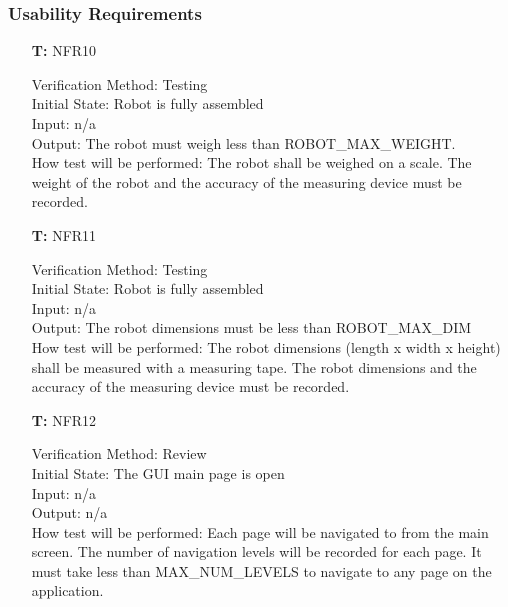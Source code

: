\documentclass[12pt, titlepage]{article}
\newcounter{tnum} %
\begin{document}
\subsubsection{Usability Requirements}

\begin{itemize}
				
\item[\textbf{T\refstepcounter{tnum}\thetnum:}]{NFR10\\}

Verification Method: Testing	\\				
Initial State: Robot is fully assembled	\\			
Input: n/a\\
Output: The robot must weigh less than ROBOT\_MAX\_WEIGHT.\\
How test will be performed: The robot shall be weighed on a scale. The weight of the robot and the accuracy of the measuring device must be recorded.\\

\item[\textbf{T\refstepcounter{tnum}\thetnum:}]{NFR11\\}

Verification Method: Testing\\					
Initial State: Robot is fully assembled	\\			
Input: n/a\\
Output: The robot dimensions must be less than ROBOT\_MAX\_DIM \\
How test will be performed: The robot dimensions (length x width x height) shall be measured with a measuring tape. The robot dimensions and the accuracy of the measuring device must be recorded.\\

\item[\textbf{T\refstepcounter{tnum}\thetnum:}]{NFR12\\}

Verification Method: Review\\					
Initial State: The GUI main page is open\\			
Input: n/a\\
Output: n/a\\
How test will be performed: Each page will be navigated to from the main screen. The number of navigation levels will be recorded for each page. It must take less than MAX\_NUM\_LEVELS to navigate to any page on the application.\\


\end{itemize}
\end{document}
